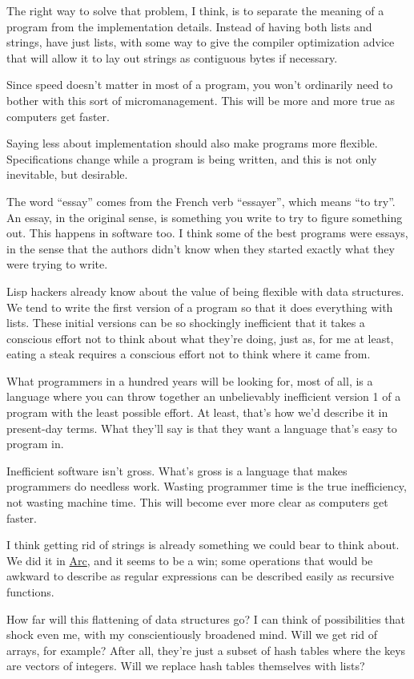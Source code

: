 \documentclass[12pt]{book}
\begin{document}
The right way to solve that problem, I think, is to separate the meaning
of a program from the implementation details. Instead of having both
lists and strings, have just lists, with some way to give the compiler
optimization advice that will allow it to lay out strings as contiguous
bytes if necessary.

Since speed doesn't matter in most of a program, you won't ordinarily
need to bother with this sort of micromanagement. This will be more and
more true as computers get faster.

Saying less about implementation should also make programs more
flexible. Specifications change while a program is being written, and
this is not only inevitable, but desirable.

The word ``essay'' comes from the French verb ``essayer'', which means
``to try''. An essay, in the original sense, is something you write to
try to figure something out. This happens in software too. I think some
of the best programs were essays, in the sense that the authors didn't
know when they started exactly what they were trying to write.

Lisp hackers already know about the value of being flexible with data
structures. We tend to write the first version of a program so that it
does everything with lists. These initial versions can be so shockingly
inefficient that it takes a conscious effort not to think about what
they're doing, just as, for me at least, eating a steak requires a
conscious effort not to think where it came from.

What programmers in a hundred years will be looking for, most of all, is
a language where you can throw together an unbelievably inefficient
version 1 of a program with the least possible effort. At least, that's
how we'd describe it in present-day terms. What they'll say is that they
want a language that's easy to program in.

Inefficient software isn't gross. What's gross is a language that makes
programmers do needless work. Wasting programmer time is the true
inefficiency, not wasting machine time. This will become ever more clear
as computers get faster.

I think getting rid of strings is already something we could bear to
think about. We did it in \href{arc.html}{Arc}, and it seems to be a
win; some operations that would be awkward to describe as regular
expressions can be described easily as recursive functions.

How far will this flattening of data structures go? I can think of
possibilities that shock even me, with my conscientiously broadened
mind. Will we get rid of arrays, for example? After all, they're just a
subset of hash tables where the keys are vectors of integers. Will we
replace hash tables themselves with lists?
\end{document}
